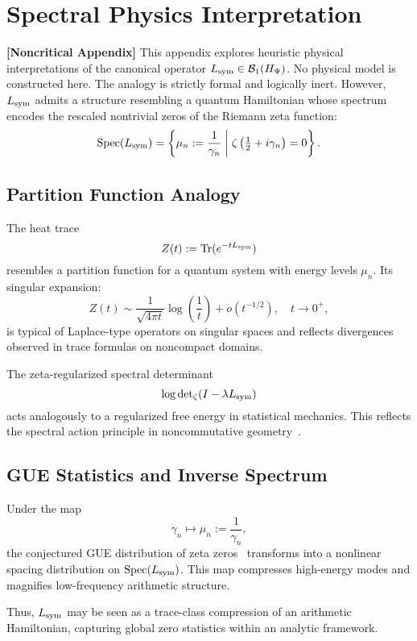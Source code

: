 \section{Spectral Physics Interpretation}
\label{app:spectral_physics_link}

\noindent\textbf{[Noncritical Appendix]}  
This appendix explores heuristic physical interpretations of the canonical operator \( L_{\mathrm{sym}} \in \mathcal{B}_1(H_{\Psi}) \). No physical model is constructed here. The analogy is strictly formal and logically inert. However, \( L_{\mathrm{sym}} \) admits a structure resembling a quantum Hamiltonian whose spectrum encodes the rescaled nontrivial zeros of the Riemann zeta function:
\[
\operatorname{Spec}(L_{\mathrm{sym}}) = \left\{ \mu_n := \frac{1}{\gamma_n} \;\middle|\; \zeta\left(\tfrac{1}{2} + i\gamma_n\right) = 0 \right\}.
\]

\subsection*{Partition Function Analogy}

The heat trace
\[
Z(t) := \operatorname{Tr}(e^{-t L_{\mathrm{sym}}})
\]
resembles a partition function for a quantum system with energy levels \( \mu_n \). Its singular expansion:
\[
Z(t) \sim \frac{1}{\sqrt{4\pi t}} \log\left( \frac{1}{t} \right) + o(t^{-1/2}), \quad t \to 0^+,
\]
is typical of Laplace-type operators on singular spaces and reflects divergences observed in trace formulas on noncompact domains.

The zeta-regularized spectral determinant
\[
\log \det\nolimits_\zeta(I - \lambda L_{\mathrm{sym}})
\]
acts analogously to a regularized free energy in statistical mechanics. This reflects the spectral action principle in noncommutative geometry~\cite{Connes1999TraceFormula, Chamseddine2007SpectralAction}.

\subsection*{GUE Statistics and Inverse Spectrum}

Under the map
\[
\gamma_n \longmapsto \mu_n := \frac{1}{\gamma_n},
\]
the conjectured GUE distribution of zeta zeros~\cite{Montgomery1973PairCorrelation, Berry1986RiemannSpectra} transforms into a nonlinear spacing distribution on \( \operatorname{Spec}(L_{\mathrm{sym}}) \). This map compresses high-energy modes and magnifies low-frequency arithmetic structure.

Thus, \( L_{\mathrm{sym}} \) may be seen as a trace-class compression of an arithmetic Hamiltonian, capturing global zero statistics within an analytic framework.

